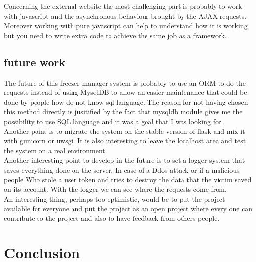 Concerning the external website the most challenging part is probably to work with javascript and the asynchronous behaviour brought by the AJAX requests. Moreover working with pure javascript can help to understand how it is working but you need to write extra code to achieve the same job as a framework.
\subsection{future work}
The future of this freezer manager system is probably to use an ORM to do the requests instead of using MysqlDB to allow an easier maintenance that could be done by people how do not know sql language. The reason for not having chosen this method directly is jusitified by the fact that mysqldb module gives me the possibility to use SQL language and it was a goal that I was looking for.\\

Another point is to migrate the system on the stable version of flask and mix it with gunicorn or uwsgi. It is also interesting to leave the localhost area and test the system on a real environment.\\

Another interesting point to develop in the future is to set a logger system that saves everything done on the server. In case of a Ddos attack or if a malicious people Who stole a user token and tries to destroy the data that the victim saved on its account. With the logger we can see where the requests come from.\\

An interesting thing, perhaps too optimistic, would be to put the project available for everyone and put the project as an open project where every one can contribute to the project and also to have feedback from others people.
\section{Conclusion}
